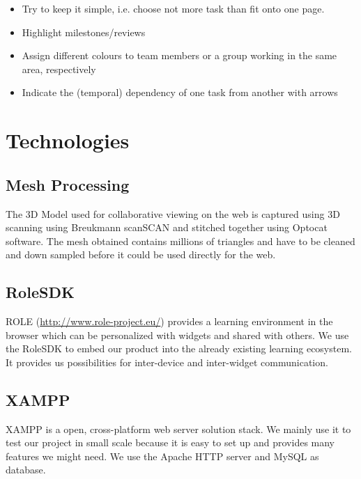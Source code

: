 \documentclass[twoside,12pt,a4paper]{article}
\begin{document}
\begin{itemize}
	\item Try to keep it simple, i.e. choose not more task than fit onto one page.
	\item Highlight milestones/reviews
	\item Assign different colours to team members or a group working in the same area, respectively
	\item Indicate the (temporal) dependency of one task from another with arrows
\end{itemize}




\newpage

\section{Technologies}
\subsection{Mesh Processing} %
\label{sec:Mesh processing}

The 3D Model used for collaborative viewing on the web is captured using 3D scanning using Breukmann scanSCAN and stitched together using Optocat software. The mesh obtained contains millions of triangles and have to be cleaned and down sampled before it could be used directly for the web.

\subsection{RoleSDK}
\label{sub:RoleSDK}
ROLE (\href{http://www.role-project.eu/}{http://www.role-project.eu/}) provides a learning environment in the browser which can be personalized with widgets and shared with others. We use the RoleSDK to embed our product into the already existing learning ecosystem. It provides us possibilities for inter-device and inter-widget communication.

\subsection{XAMPP}
\label{sub:XAMPP}
XAMPP is a open, cross-platform web server solution stack. We mainly use it to test our project in small scale because it is easy to set up and provides many features we might need. We use the Apache HTTP server and MySQL as database.
\end{document}
